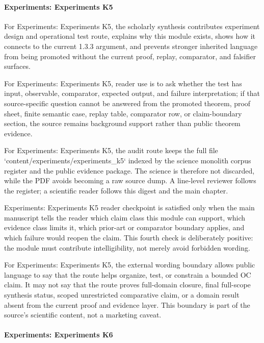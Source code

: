 \paragraph{Experiments: Experiments K5}

For Experiments: Experiments K5, the scholarly synthesis contributes experiment design and operational test route, explains why this module exists, shows how it connects to the current 1.3.3 argument, and prevents stronger inherited language from being promoted without the current proof, replay, comparator, and falsifier surfaces.


For Experiments: Experiments K5, reader use is to ask whether the test has input, observable, comparator, expected output, and failure interpretation; if that source-specific question cannot be answered from the promoted theorem, proof sheet, finite semantic case, replay table, comparator row, or claim-boundary section, the source remains background support rather than public theorem evidence.


For Experiments: Experiments K5, the audit route keeps the full file `content/experiments/experiments\_k5` indexed by the science monolith corpus register and the public evidence package. The science is therefore not discarded, while the PDF avoids becoming a raw source dump. A line-level reviewer follows the register; a scientific reader follows this digest and the main chapter.


Experiments: Experiments K5 reader checkpoint is satisfied only when the main manuscript tells the reader which claim class this module can support, which evidence class limits it, which prior-art or comparator boundary applies, and which failure would reopen the claim. This fourth check is deliberately positive: the module must contribute intelligibility, not merely avoid forbidden wording.


For Experiments: Experiments K5, the external wording boundary allows public language to say that the route helps organize, test, or constrain a bounded OC claim. It may not say that the route proves full-domain closure, final full-scope synthesis status, scoped unrestricted comparative claim, or a domain result absent from the current proof and evidence layer. This boundary is part of the source's scientific content, not a marketing caveat.


\paragraph{Experiments: Experiments K6}

